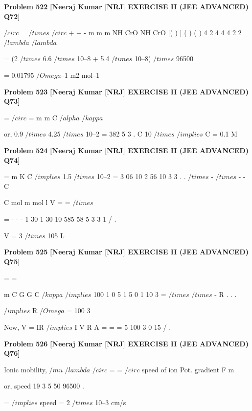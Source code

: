 \begin{problembox}
\textbf{Problem 522} \hfill \textbf{[Neeraj Kumar [NRJ] EXERCISE II (JEE ADVANCED) Q72]}
\label{q:ext-nrj_all_questions-522}

 $/circ$
=
$/times$
$/circ$
+
+
-
m
m
m
NH
CrO
NH
CrO
[(
)
]
(
)
(
)
4 2
4
4
4
2
2
$/lambda$
$/lambda$
 
 = (2 $/times$ 6.6 $/times$ 10--8 + 5.4 $/times$ 10--8) $/times$ 96500 
 
 = 0.01795 $/Omega$--1 m2 mol--1
\end{problembox}

\begin{problembox}
\textbf{Problem 523} \hfill \textbf{[Neeraj Kumar [NRJ] EXERCISE II (JEE ADVANCED) Q73]}
\label{q:ext-nrj_all_questions-523}

 
=
  $/circ$
=
m
m
C
$/alpha$
$/kappa$
 
 or, 0.9 $/times$ 4.25 $/times$ 10--2 = 382 5
3
.
C
10
$/times$
 $/implies$ C = 0.1 M
\end{problembox}

\begin{problembox}
\textbf{Problem 524} \hfill \textbf{[Neeraj Kumar [NRJ] EXERCISE II (JEE ADVANCED) Q74]}
\label{q:ext-nrj_all_questions-524}

 
=
m
K
C $/implies$ 1.5 $/times$ 10--2 = 3 06
10
2 56
10
3
3
.
.
$/times$
-
$/times$
-
-
C
 
   C
mol m
mol l
V
=
=
$/times$
 
=
-
-
-
1
30
1
30 10
585 58 5
3
3
1
/
.
 
   V = 3 $/times$ 105 L
\end{problembox}

\begin{problembox}
\textbf{Problem 525} \hfill \textbf{[Neeraj Kumar [NRJ] EXERCISE II (JEE ADVANCED) Q75]}
\label{q:ext-nrj_all_questions-525}

 
=
=
 
 
m
C
G G
C
$/kappa$
$/implies$ 100
1
0 5
1 5
0 1 10 3
=
$/times$
$/times$
-
R
.
.
.
 
 
 $/implies$ R
$/Omega$
= 100
3
 
 Now, V = IR $/implies$ I
V
R
A
=
=
=
5
100 3
0 15
/
.
\end{problembox}

\begin{problembox}
\textbf{Problem 526} \hfill \textbf{[Neeraj Kumar [NRJ] EXERCISE II (JEE ADVANCED) Q76]}
\label{q:ext-nrj_all_questions-526}

Ionic mobility, $/mu$
$/lambda$
$/circ$ =
=
$/circ$
speed of ion
Pot. gradient
F
m
 
 or, speed
19 3
5
50
96500
.
 
  
 
  
=
 $/implies$ speed = 2 $/times$ 10--3 cm/s
\end{problembox}

